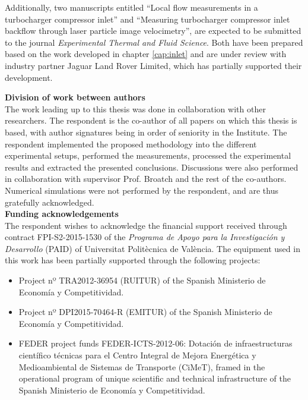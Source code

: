 \documentclass[final,twoside,11pt]{book}
\numberwithin{equation}{section}
\numberwithin{figure}{chapter}
\numberwithin{table}{chapter}
\begin{document}
Additionally, two manuscripts entitled ``Local flow measurements in a turbocharger compressor inlet'' and ``Measuring turbocharger compressor inlet backflow through laser particle image velocimetry'', are expected to be submitted to the journal \emph{Experimental Thermal and Fluid Science}. Both have been prepared based on the work developed in chapter \ref{cap:inlet} and are under review with industry partner Jaguar Land Rover Limited, which has partially supported their development.

\newpage

{\bfseries\sffamily\Large\noindent Division of work between authors}\\[-1mm]

\noindent The work leading up to this thesis was done in collaboration with other researchers. The respondent is the co-author of all papers on which this thesis is based, with author signatures being in order of seniority in the Institute. The respondent implemented the proposed methodology into the different experimental setups, performed the measurements, processed the experimental results and extracted the presented conclusions. Discussions were also performed in collaboration with supervisor Prof. Broatch and the rest of the co-authors. Numerical simulations were not performed by the respondent, and are thus gratefully acknowledged.\\[2mm]

{\bfseries\sffamily\Large\noindent Funding acknowledgements}\\[-1mm]

\noindent The respondent wishes to acknowledge the financial support received through contract FPI-S2-2015-1530 of the \emph{Programa de Apoyo para la Investigación y Desarrollo} (PAID) of Universitat Politècnica de València. The equipment used in this work has been partially supported through the following projects:

\begin{itemize}
  \item Project nº TRA2012-36954 {(RUITUR)} of the Spanish Ministerio de Economía y Competitividad.
  \item Project nº DPI2015-70464-R {(EMITUR)} of the Spanish Ministerio de Economía y Competitividad.
  \item FEDER project funds FEDER-ICTS-2012-06: Dotación de infraestructuras científico técnicas para el Centro Integral de Mejora Energética y Medioambiental de Sistemas de Transporte (CiMeT), framed in the operational program of unique scientific and technical infrastructure of the Spanish Ministerio de Economía y Competitividad.
\end{itemize}
\end{document}
